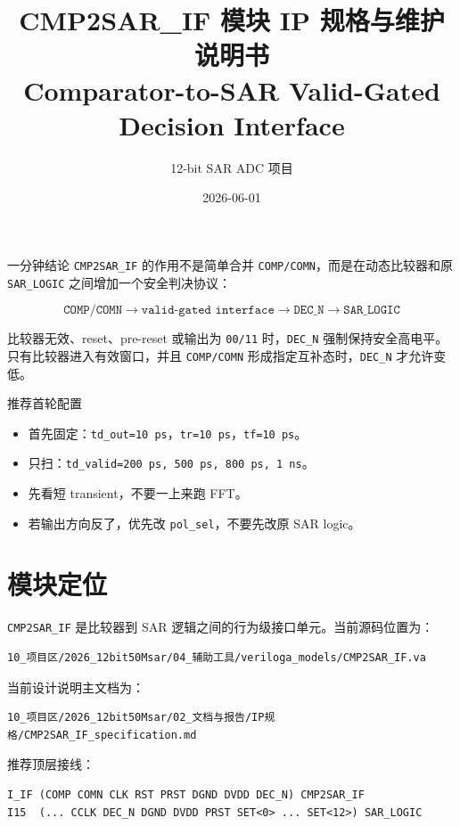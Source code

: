 \documentclass[11pt,a4paper,UTF8]{ctexart}
\title{\textbf{CMP2SAR\_IF 模块 IP 规格与维护说明书}\\
\large Comparator-to-SAR Valid-Gated Decision Interface}
\author{12-bit SAR ADC 项目}
\date{2026-06-01}
\begin{document}
\maketitle

\begin{summarybox}{一分钟结论}
\texttt{CMP2SAR\_IF} 的作用不是简单合并 \texttt{COMP/COMN}，而是在动态比较器和原 \texttt{SAR\_LOGIC} 之间增加一个安全判决协议：

\[
\texttt{COMP/COMN} \rightarrow \texttt{valid-gated interface} \rightarrow \texttt{DEC\_N} \rightarrow \texttt{SAR\_LOGIC}
\]

比较器无效、reset、pre-reset 或输出为 \texttt{00/11} 时，\texttt{DEC\_N} 强制保持安全高电平。只有比较器进入有效窗口，并且 \texttt{COMP/COMN} 形成指定互补态时，\texttt{DEC\_N} 才允许变低。
\end{summarybox}

\begin{notebox}{推荐首轮配置}
\begin{itemize}
    \item 首先固定：\texttt{td\_out=10 ps}，\texttt{tr=10 ps}，\texttt{tf=10 ps}。
    \item 只扫：\texttt{td\_valid=200 ps, 500 ps, 800 ps, 1 ns}。
    \item 先看短 transient，不要一上来跑 FFT。
    \item 若输出方向反了，优先改 \texttt{pol\_sel}，不要先改原 SAR logic。
\end{itemize}
\end{notebox}

\section{模块定位}

\texttt{CMP2SAR\_IF} 是比较器到 SAR 逻辑之间的行为级接口单元。当前源码位置为：

\begin{lstlisting}[style=va,numbers=none]
10_项目区/2026_12bit50Msar/04_辅助工具/veriloga_models/CMP2SAR_IF.va
\end{lstlisting}

当前设计说明主文档为：

\begin{lstlisting}[style=va,numbers=none]
10_项目区/2026_12bit50Msar/02_文档与报告/IP规格/CMP2SAR_IF_specification.md
\end{lstlisting}

推荐顶层接线：

\begin{lstlisting}[style=va,numbers=none]
I_IF (COMP COMN CLK RST PRST DGND DVDD DEC_N) CMP2SAR_IF
I15  (... CCLK DEC_N DGND DVDD PRST SET<0> ... SET<12>) SAR_LOGIC
\end{lstlisting}
\end{document}
